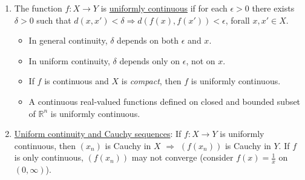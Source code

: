 \documentclass[%
 aip,
 jmp,%
 amsmath,amssymb,
 reprint,%
]{revtex4-1}
\def\R{{\mathbb R}}
\def\d{\delta}
\def\e{\epsilon}
\newcommand{\imply}{\Rightarrow}
\newcommand{\defn}[1]{\underline{#1}}
\begin{document}
\begin{enumerate}
   \item The function $f: X \to Y$ is \defn{uniformly continuous} if for each
     $\e > 0$ there exists $\d > 0$ such that $d(x, x') < \d \imply d(f(x), f(x')) < \e$,
     forall $x,x' \in X$.
          \begin{itemize}
            \item In general continuity, $\d$ depends on both $\e$ and $x$.
            \item In uniform continuity, $\d$ depends only on $\e$, not on $x$.
            \item If $f$ is continuous and $X$ is \emph{compact}, then $f$ is uniformly continuous.
            \item A continuous real-valued functions defined on closed and bounded subset of $\R^n$
                  is uniformly continuous.
          \end{itemize}

    \item \defn{Uniform continuity and Cauchy sequences}: If $f: X\to Y$ is uniformly continuous,
       then $(x_n)$ is Cauchy in $X$ $\imply$ $(f(x_n))$ is Cauchy in $Y$.
       {\footnotesize\color{gray}
        If $f$ is only continuous, $(f(x_n))$ may not converge
        (consider $f(x) = \frac{1}{x}$ on $(0, \infty)$).
       }
\end{enumerate}
\end{document}
